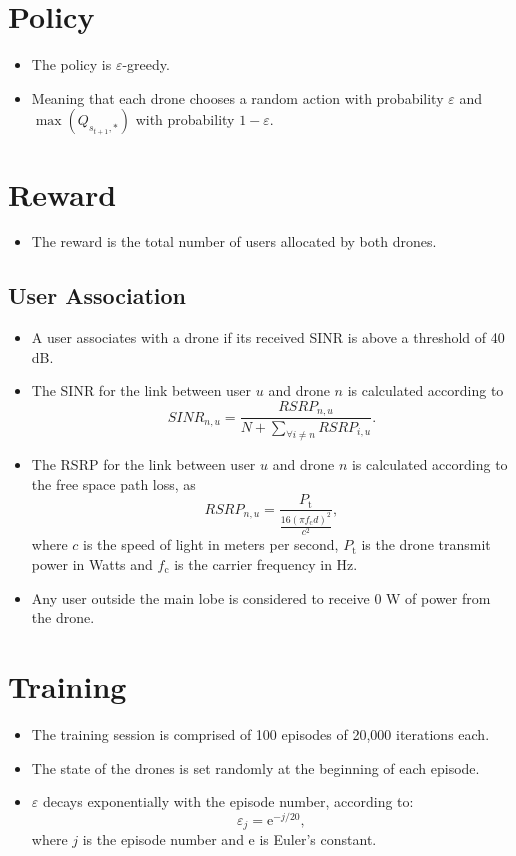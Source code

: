 \documentclass{IEEEtran}
\begin{document}
\section{Policy}
\begin{itemize}
    \item The policy is $\varepsilon$-greedy.
    \item Meaning that each drone chooses a random action with probability $\varepsilon$ and $\max (Q_{s_{t+1}, *})$ with probability $1 - \varepsilon$.
\end{itemize}
\section{Reward}
\begin{itemize}
    \item The reward is the total number of users allocated by both drones.
\end{itemize}
\subsection{User Association}
\begin{itemize}
    \item A user associates with a drone if its received SINR is above a threshold of 40 dB.
    \item The SINR for the link between user $u$ and drone $n$ is calculated according to
        \begin{equation}
            SINR_{n,u} = \frac{RSRP_{n, u}}{N + \sum_{\forall i \neq n} RSRP_{i, u}}.
        \end{equation}
    \item The RSRP for the link between user $u$ and drone $n$ is calculated according to the free space path loss, as
        \begin{equation}
            RSRP_{n,u} = \frac{P_\text{t}}{\frac{16 {(\pi  f_\text{c} d)}^2}{c^2}},
        \end{equation}
        where $c$ is the speed of light in meters per second, $P_\text{t}$ is the drone transmit power in Watts and $f_\text{c}$ is the carrier frequency in Hz.
    \item Any user outside the main lobe is considered to receive 0 W of power from the drone.
\end{itemize}
\section{Training}
\begin{itemize}
    \item The training session is comprised of 100 episodes of 20,000 iterations each.
    \item The state of the drones is set randomly at the beginning of each episode.
    \item $\varepsilon$ decays exponentially with the episode number, according to:
        \begin{equation}
            \varepsilon_j = \mathrm{e}^{-j/20},
        \end{equation}
        where $j$ is the episode number and $\mathrm{e}$ is Euler's constant.
\end{itemize}
\end{document}

